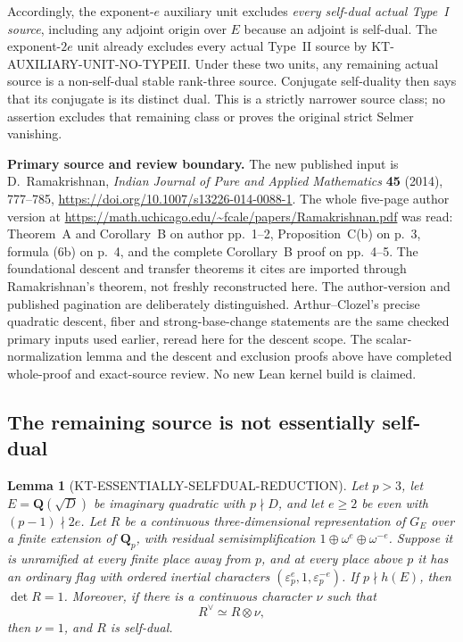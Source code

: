 \documentclass[11pt,a4paper]{article}
\newtheorem{lemma}[theorem]{Lemma}
\theoremstyle{definition}
\renewcommand{\paragraph}[1]{\par\smallskip\noindent\textbf{#1}\quad\ignorespaces}
\begin{document}
Accordingly, the exponent-$e$ auxiliary unit excludes
\emph{every self-dual actual Type~I source}, including any
adjoint origin over $E$ because an adjoint is self-dual.
The exponent-$2e$ unit already excludes every actual Type~II
source by KT-AUXILIARY-UNIT-NO-TYPEII.
Under these two units, any remaining actual source is a
non-self-dual stable rank-three source.  Conjugate self-duality
then says that its conjugate is its distinct dual.  This is a
strictly narrower source class; no assertion excludes that
remaining class or proves the original strict Selmer vanishing.

\paragraph{Primary source and review boundary.}
The new published input is D.~Ramakrishnan, \emph{Indian Journal
of Pure and Applied Mathematics} \textbf{45} (2014), 777--785,
\url{https://doi.org/10.1007/s13226-014-0088-1}.
The whole five-page author version at
\url{https://math.uchicago.edu/~fcale/papers/Ramakrishnan.pdf}
was read: Theorem~A and Corollary~B on author pp.~1--2,
Proposition~C(b) on p.~3, formula (6b) on p.~4, and the
complete Corollary~B proof on pp.~4--5.  The foundational
descent and transfer theorems it cites are imported through
Ramakrishnan's theorem, not freshly reconstructed here.
The author-version and published pagination are deliberately
distinguished.  Arthur--Clozel's precise quadratic descent,
fiber and strong-base-change statements are the same checked
primary inputs used earlier, reread here for the descent scope.
The scalar-normalization lemma and the descent and exclusion
proofs above have completed whole-proof and exact-source review.
No new Lean kernel build is claimed.



\subsection{The remaining source is not essentially self-dual}
\label{sec:kt-essential-selfdual-reduction}

\begin{lemma}[KT-ESSENTIALLY-SELFDUAL-REDUCTION]
Let $p>3$, let $E=\mathbf Q(\sqrt D)$ be imaginary quadratic with
$p\nmid D$, and let $e\ge2$ be even with $(p-1)\nmid2e$.
Let $R$ be a continuous three-dimensional representation of
$G_E$ over a finite extension of $\mathbf Q_p$, with residual
semisimplification $1\oplus\omega^e\oplus\omega^{-e}$.
Suppose it is unramified at every finite place away from $p$,
and at every place above $p$ it has an ordinary flag with
ordered inertial characters
$(\varepsilon_p^e,1,\varepsilon_p^{-e})$.
If $p\nmid h(E)$, then $\det R=1$.
Moreover, if there is a continuous character $\nu$ such that
\[
                          R^\vee\simeq R\otimes\nu,       \tag{ES.1}
\]
then $\nu=1$, and $R$ is self-dual.
\end{lemma}
\end{document}
